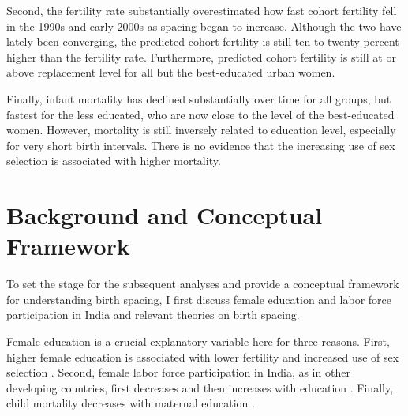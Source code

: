 \documentclass[12pt,letterpaper]{article}
\begin{document}
Second, the fertility rate substantially overestimated how fast cohort fertility fell in the 
1990s and early 2000s as spacing began to increase. 
Although the two have lately been converging, the predicted cohort fertility is still ten to 
twenty percent higher than the fertility rate. 
Furthermore, predicted cohort fertility is still at or above replacement level for all but 
the best-educated urban women. 

Finally, infant mortality has declined substantially over time for all groups, but fastest 
for the less educated, who are now close to the level of the best-educated women. 
However, mortality is still inversely related to education level, especially for very short 
birth intervals. 
There is no evidence that the increasing use of sex selection is associated with higher mortality.




\section{Background and Conceptual Framework}

To set the stage for the subsequent analyses and provide a conceptual framework for 
understanding birth spacing, I first discuss female education and labor force 
participation in India and relevant theories on birth spacing.


Female education is a crucial explanatory variable here for three reasons.
First, higher female education is associated with lower fertility and increased use of 
sex selection
\citep{das_gupta97,dreze01,bhat03,retherford03b,Guilmoto2009a,Portner2015b,Jayachandran2017}.
Second, female labor force participation in India, as in other developing countries, 
first decreases and then increases with education
\citep{Klasen2015,Fletcher2017,Afridi2018,Bhargava2018,Chatterjee2018,Bhargava2019}.
Finally, child mortality decreases with maternal education
\citep{Rosenzweig1982a,Whitworth2002,Maitra2008}.

\end{document}
